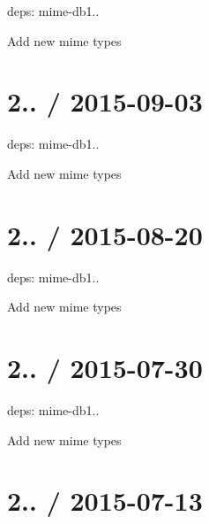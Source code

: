 \begin{DoxyItemize}
\item deps\+: mime-\/db1..
\begin{DoxyItemize}
\item Add new mime types
\end{DoxyItemize}
\end{DoxyItemize}

\section*{2.. / 2015-\/09-\/03 }


\begin{DoxyItemize}
\item deps\+: mime-\/db1..
\begin{DoxyItemize}
\item Add new mime types
\end{DoxyItemize}
\end{DoxyItemize}

\section*{2.. / 2015-\/08-\/20 }


\begin{DoxyItemize}
\item deps\+: mime-\/db1..
\begin{DoxyItemize}
\item Add new mime types
\end{DoxyItemize}
\end{DoxyItemize}

\section*{2.. / 2015-\/07-\/30 }


\begin{DoxyItemize}
\item deps\+: mime-\/db1..
\begin{DoxyItemize}
\item Add new mime types
\end{DoxyItemize}
\end{DoxyItemize}

\section*{2.. / 2015-\/07-\/13 }


